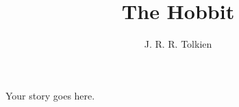 \documentclass[submission]{sffms}
\title{The Hobbit}
\author{J. R. R. Tolkien}
\begin{document}
Your story goes here.
\end{document}
